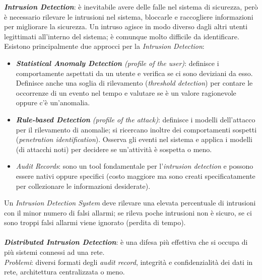 \documentclass[11pt, a4paper, twoside, italian]{report}
\theoremstyle{plain}
\begin{document}
\noindent
\textit{\textbf{Intrusion Detection}}: è inevitabile avere delle falle nel sistema di sicurezza, però è necessario rilevare le intrusioni nel sistema, bloccarle e raccogliere informazioni per migliorare la sicurezza. Un intruso agisce in modo diverso dagli altri utenti legittimati all'interno del sistema; è comunque molto difficile da identificare.
\newpage
\noindent
Esistono principalmente due approcci per la \textit{Intrusion Detection}:
\begin{itemize}
	\item \textit{\textbf{Statistical Anomaly Detection} (profile of the user)}: definisce i comportamente aspettati da un utente e verifica se ci sono deviziani da esso. Definisce anche una soglia di rilevamento (\textit{threshold detection}) per contare le occorrenze di un evento nel tempo e valutare se è un valore ragionevole oppure c'è un'anomalia.
	\item \textit{\textbf{Rule-based Detection} (profile of the attack)}: definisce i modelli dell'attacco per il rilevamento di anomalie; si ricercano inoltre dei comportamenti sospetti (\textit{penetration identification}). Osserva gli eventi nel sistema e applica i modelli (di attacchi noti) per decidere se un'attività è sospetta o meno.
	\item \textit{Audit Records}: sono un tool fondamentale per l'\textit{intrusion detection} e possono essere nativi oppure specifici (costo maggiore ma sono creati specificatamente per collezionare le informazioni desiderate).
\end{itemize}
\noindent
Un \textit{Intrusion Detection System} deve rilevare una elevata percentuale di intrusioni con il minor numero di falsi allarmi; se rileva poche intrusioni non è sicuro, se ci sono troppi falsi allarmi viene ignorato (perdita di tempo).\\
\\
\textit{\textbf{Distributed Intrusion Detection}}: è una difesa più effettiva che si occupa di più sistemi connessi ad una rete.\\
\textit{Problemi}: diversi formati degli \textit{audit record}, integrità e confidenzialità dei dati in rete, architettura centralizzata o meno.
\end{document}
